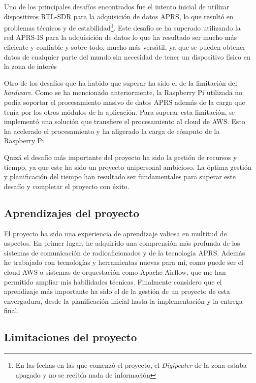 Uno de los principales desafíos encontrados fue el intento inicial de utilizar dispositivos RTL-SDR para la adquisición de datos APRS, lo que resultó en problemas técnicos y de estabilidad\footnote{En las fechas en las que comenzó el proyecto, el \textit{Digipeater} de la zona estaba apagado y no se recibía nada de información}. Este desafío se ha superado utilizando la red APRS-IS para la adquisición de datos lo que ha resultado ser mucho más eficiente y confiable y sobre todo, mucho más versátil, ya que se pueden obtener datos de cualquier parte del mundo sin necesidad de tener un dispositivo físico en la zona de interés

Otro de los desafíos que ha habido que superar ha sido el de la limitación del \textit{hardware}. Como se ha mencionado anteriormente, la Raspberry Pi utilizada no podía soportar el procesamiento masivo de datos APRS además de la carga que tenía por los otros módulos de la aplicación. Para superar esta limitación, se implementó una solución que transfiere el procesamiento al cloud de AWS. Esto ha acelerado el procesamiento y ha aligerado la carga de cómputo de la Raspberry Pi.

Quizá el desafío más importante del proyecto ha sido la gestión de recursos y tiempo, ya que este ha sido un proyecto unipersonal ambicioso. La óptima gestión y planificación del tiempo han resultado ser fundamentales para superar este desafío y completar el proyecto con éxito.

\subsection{Aprendizajes del proyecto}

El proyecto ha sido una experiencia de aprendizaje valiosa en multitud de aspectos. En primer lugar, he adquirido una comprensión más profunda de los sistemas de comunicación de radioaficionados y de la tecnología APRS. Además he trabajado con tecnologías y herramientas nuevas para mí, como puede ser el cloud AWS o sistemas de orquestación como Apache Airflow, que me han permitido ampliar mis habilidades técnicas. Finalmente considero que el aprendizaje más importante ha sido el de la gestión de un proyecto de esta envergadura, desde la planificación inicial hasta la implementación y la entrega final.

\subsection{Limitaciones del proyecto}

